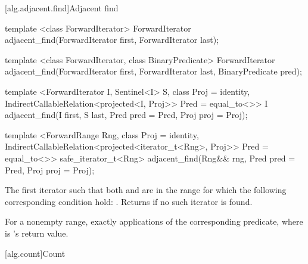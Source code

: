 [alg.adjacent.find]{Adjacent find}

%
\begin{removedblock}
\begin{itemdecl}
template <class ForwardIterator>
  ForwardIterator adjacent_find(ForwardIterator first, ForwardIterator last);

template <class ForwardIterator, class BinaryPredicate>
  ForwardIterator adjacent_find(ForwardIterator first, ForwardIterator last,
                              BinaryPredicate pred);
\end{itemdecl}
\end{removedblock}
\begin{addedblock}
\begin{itemdecl}
template <ForwardIterator I, Sentinel<I> S, class Proj = identity,
    IndirectCallableRelation<projected<I, Proj>> Pred = equal_to<>>
  I
    adjacent_find(I first, S last, Pred pred = Pred{},
                  Proj proj = Proj{});

template <ForwardRange Rng, class Proj = identity,
    IndirectCallableRelation<projected<iterator_t<Rng>, Proj>> Pred = equal_to<>>
  safe_iterator_t<Rng>
    adjacent_find(Rng&& rng, Pred pred = Pred{}, Proj proj = Proj{});
\end{itemdecl}
\end{addedblock}

\begin{itemdescr}
\pnum
\returns
The first iterator
such that both
and
are in
the range
for which
the following corresponding condition hold:
.
Returns 
if no such iterator is found.

\pnum
\complexity
For a nonempty range, exactly
applications of the corresponding predicate, where  is
's
return value.
\end{itemdescr}

[alg.count]{Count}

